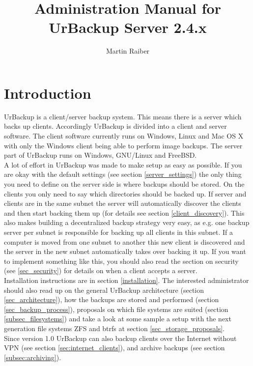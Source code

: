 \documentclass[a4paper,10pt]{article}
\begin{document}

\author{Martin Raiber}
\title{Administration Manual for\\UrBackup Server 2.4.x}

\maketitle

\tableofcontents

\newpage

\section{Introduction}

UrBackup is a client/server backup system. This means there is a server
which backs up clients. Accordingly UrBackup is divided into a client and server
software.
The client software currently runs on Windows, Linux and Mac OS X with only
the Windows client being able to perform image backups. 
The server part of UrBackup runs on Windows, GNU/Linux and FreeBSD.\\
A lot of effort in UrBackup was made to make setup as easy as possible. If you
are okay with the default settings (see section \ref{server_settings}) the only
thing you need to define on the server side is where backups should be stored.
On the clients you only need to say which directories should be backed up. If
server and clients are in the same subnet the server will automatically discover
the clients and then start backing them up (for details see section
\ref{client_discovery}). This also makes building a decentralized backup
strategy very easy, as e.g. one backup server per subnet is responsible for
backing up all clients in this subnet. If a computer is moved from one subnet to
another this new client is discovered and the server in the new subnet
automatically takes over backing it up. If you want to implement something like
this, you should also read the section on security (see \ref{sec_security}) for
details on when a client accepts a server.\\
Installation instructions are in section \ref{installation}.
The interested administrator should also read up on the general UrBackup architecture
(section \ref{sec_architecture}), how the backups are stored and performed
(section \ref{sec_backup_process}), proposals on which file systems are suited
(section \ref{subsec_filesystems}) and take a look at some sample a setup with
the next generation file systems ZFS and btrfs at section \ref{sec_storage_proposals}.\\
Since version 1.0 UrBackup can also backup clients over the Internet without VPN (see section
\ref{sec:internet_clients}), and archive backups (see section \ref{subsec:archiving}).
\end{document}
